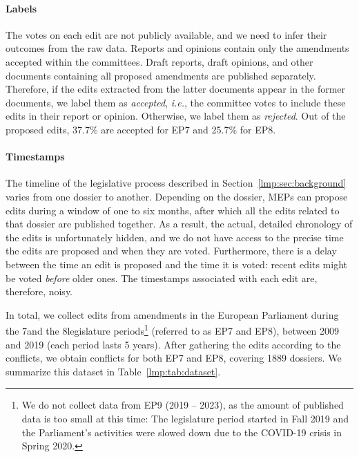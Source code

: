 \paragraph{Labels}
The votes on each edit are not publicly available, and we need to infer their outcomes from the raw data.
Reports and opinions contain only the amendments accepted within the committees.
Draft reports, draft opinions, and other documents containing all proposed amendments are published separately.
Therefore, if the edits extracted from the latter documents  appear in the former documents, we label them as \emph{accepted}, \textit{i.e.}, the committee votes to include these edits in their report or opinion.
Otherwise, we label them as \emph{rejected}.
Out of the proposed edits, 37.7\% are accepted for EP7 and 25.7\% for EP8.

\paragraph{Timestamps}
The timeline of the legislative process described in Section~\ref{lmp:sec:background} varies from one dossier to another.
Depending on the dossier, MEPs can propose edits during a window of one to six months, after which all the edits related to that dossier are published together.
As a result, the actual, detailed chronology of the edits is unfortunately hidden, and we do not have access to the precise time the edits are proposed and when they are voted.
Furthermore, there is a delay between the time an edit is proposed and the time it is voted: recent edits might be voted \emph{before} older ones.
The timestamps associated with each edit are, therefore, noisy.



In total, we collect  edits from  amendments in the European Parliament during the 7\th and the 8\th legislature periods\footnote{We do not collect data from EP9 (2019 -- 2023), as the amount of published data is too small at this time: The legislature period started in Fall 2019 and the Parliament's activities were slowed down due to the COVID-19 crisis in Spring 2020.} (referred to as EP7 and EP8), between 2009 and 2019 (each period lasts 5 years).
After gathering the edits according to the conflicts, we obtain  conflicts for both EP7 and EP8, covering 1889 dossiers.
We summarize this dataset in Table~\ref{lmp:tab:dataset}.

